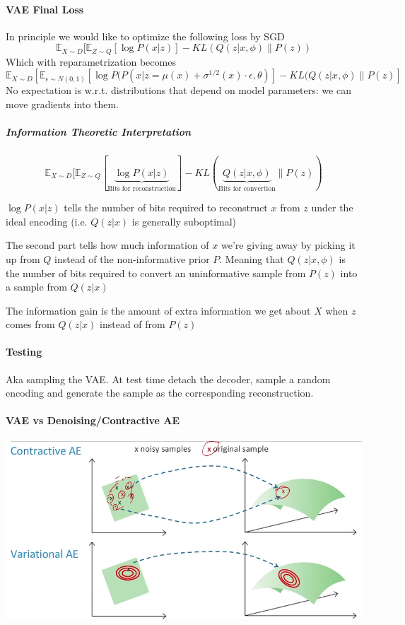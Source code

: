 \documentclass[10pt]{report}
\begin{document}
\paragraph{VAE Final Loss} In principle we would like to optimize the following loss by SGD
$$\mathbb{E}_{X\sim D}[\mathbb{E}_{Z\sim Q}[\log P(x|z)]-KL(Q(z|x,\phi)\|P(z))$$
Which with reparametrization becomes
$$\mathbb{E}_{X\sim D}[\mathbb{E}_{\epsilon\sim N(0,1)}[\log P(P(x|z=\mu(x)+\sigma^{1/2}(x)\cdot\epsilon,\theta)]- KL(Q(z|x,\phi)\|P(z)]$$
No expectation is w.r.t. distributions that depend on model parameters: we can move gradients into them.
\subparagraph{Information Theoretic Interpretation}
$$\mathbb{E}_{X\sim D}[\mathbb{E}_{Z\sim Q}[\underset{\text{Bits for reconstruction}}{\underbrace{\log P(x|z)}}]-KL(\underset{\text{Bits for convertion}}{\underbrace{Q(z|x,\phi)}}\|P(z))$$
\begin{list}{}{}
	\item $\log P(x|z)$ tells the number of bits required to reconstruct $x$ from $z$ under the ideal encoding (i.e. $Q(z|x)$ is generally suboptimal)
	\item The second part tells how much information of $x$ we're giving away by picking it up from $Q$ instead of the non-informative prior $P$. Meaning that $Q(z|x,\phi)$ is the number of bits required to convert an uninformative sample from $P(z)$ into a sample from $Q(z|x)$
	\item The information gain is the amount of extra information we get about $X$ when $z$ comes from $Q(z|x)$ instead of from $P(z)$
\end{list}
\paragraph{Testing} Aka sampling the VAE. At test time detach the decoder, sample a random encoding and generate the sample as the corresponding reconstruction.
\paragraph{VAE vs Denoising/Contractive AE}
\begin{center}
	\includegraphics[scale=0.5]{145.png}
\end{center}
\end{document}
